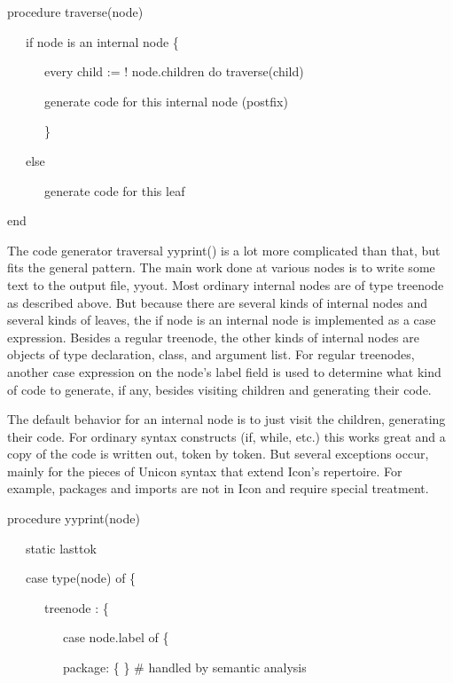 {\ttfamily\mdseries
procedure traverse(node)}

{\ttfamily\mdseries
\ \ \ if node is an internal node \{}

{\ttfamily\mdseries
\ \ \ \ \ \ every child := ! node.children do traverse(child)}

{\ttfamily\mdseries
\ \ \ \ \ \ generate code for this internal node (postfix)}

{\ttfamily\mdseries
\ \ \ \ \ \ \}}

{\ttfamily\mdseries
\ \ \ else}

{\ttfamily\mdseries
\ \ \ \ \ \ generate code for this leaf}

{\ttfamily\mdseries
end}

The code generator traversal yyprint() is a lot more complicated than
that, but fits the general pattern. The main work done at various
nodes is to write some text to the output file, yyout. Most ordinary
internal nodes are of type treenode as described above. But because
there are several kinds of internal nodes and several kinds of leaves,
the {\textquotedbl}if node is an internal node{\textquotedbl} is
implemented as a case expression. Besides a regular treenode, the
other kinds of internal nodes are objects of type declaration, class,
and argument list. For regular treenodes, another case expression on
the node's label field is used to determine what kind of code to
generate, if any, besides visiting children and generating their code.

The default behavior for an internal node is to just visit the
children, generating their code. For ordinary syntax constructs (if,
while, etc.) this works great and a copy of the code is written out,
token by token. But several exceptions occur, mainly for the pieces of
Unicon syntax that extend Icon's repertoire. For example, packages and
imports are not in Icon and require special treatment.

{\ttfamily\mdseries
procedure yyprint(node)}

{\ttfamily\mdseries
\ \ \ static lasttok}

{\ttfamily\mdseries
\ \ \ case type(node) of \{}

{\ttfamily\mdseries
\ \ \ \ \ \ {\textquotedbl}treenode{\textquotedbl} : \{}

{\ttfamily\mdseries
\ \ \ \ \ \ \ \ \ case node.label of \{}

{\ttfamily\mdseries
\ \ \ \ \ \ \ \ \ {\textquotedbl}package{\textquotedbl}: \{ \} \# handled by semantic analysis}

